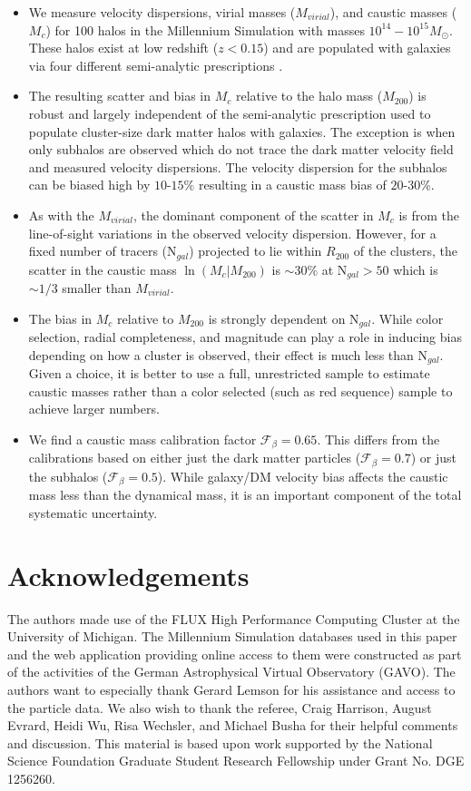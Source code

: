 \documentclass[iop]{emulateapj}
\begin{document}
\begin{itemize}
\item We measure velocity dispersions, virial masses ($M_{virial}$), and caustic masses ($M_{c}$) for 100 halos in the Millennium Simulation with masses $10^{14} - 10^{15}M_{\odot}$. These halos exist at low redshift ($z < 0.15$) and are populated with galaxies via four different semi-analytic prescriptions \citep{Guo11,Delucia07,Bower06,Bertone07}.
\item The resulting scatter and bias in $M_c$ relative to the halo mass ($M_{200}$) is robust and largely independent of the semi-analytic prescription used to populate cluster-size dark matter halos with galaxies. The exception is when only subhalos are observed which do not trace the dark matter velocity field and measured velocity dispersions. The velocity dispersion for the subhalos can be biased high by $10$-$15\%$ resulting in a caustic mass bias of $20$-$30\%$.
\item As with the $M_{virial}$, the dominant component of the scatter in $M_c$ is from the line-of-sight variations in the observed velocity dispersion. However, for a fixed number of tracers (N$_{gal}$) projected to lie within $R_{200}$ of the clusters, the scatter in the caustic mass $\ln (M_c|M_{200})$ is $\sim 30\%$ at N$_{gal} > 50$ which is  $\sim 1/3$ smaller than $M_{virial}$.
\item The bias in $M_c$ relative to $M_{200}$ is strongly dependent on N$_{gal}$. While color selection, radial completeness, and magnitude can play a role in inducing bias depending on how a cluster is observed, their effect is much less than N$_{gal}$. Given a choice, it is better to use a full, unrestricted sample to estimate caustic masses rather than a color selected (such as red sequence) sample to achieve larger numbers.
\item We find a caustic mass calibration factor $\mathcal{F}_{\beta} = 0.65$. This differs from the calibrations based on either just the dark matter particles ($\mathcal{F}_{\beta} = 0.7$) or just the subhalos ($\mathcal{F}_{\beta} = 0.5$). While galaxy/DM velocity bias affects the caustic mass less than the dynamical mass, it is an important component of the total systematic uncertainty.
\end{itemize}

\section{Acknowledgements}
The authors made use of the FLUX High Performance Computing Cluster at the University of Michigan. The Millennium Simulation databases used in this paper and the web application providing online access to them were constructed as part of the activities of the German Astrophysical Virtual Observatory (GAVO). The authors want to especially thank Gerard Lemson for his assistance and access to the particle data. We also wish to thank the referee, Craig Harrison, August Evrard, Heidi Wu, Risa Wechsler, and Michael Busha for their helpful comments and discussion. This material is based upon work supported by the National Science Foundation Graduate Student Research Fellowship under Grant No. DGE 1256260.
\end{document}
